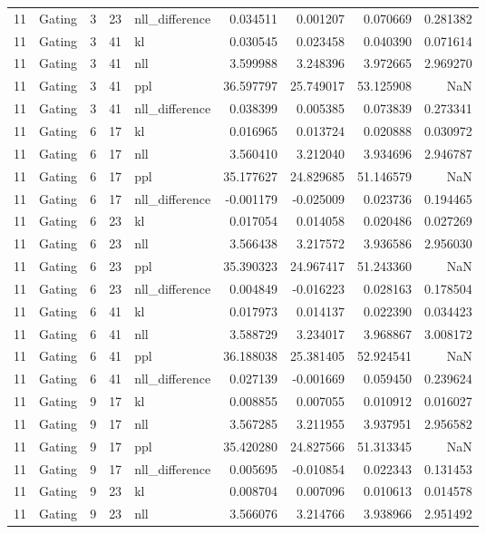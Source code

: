 \begin{tabular}{rlrrlrrrr}
11 & Gating & 3 & 23 & nll_difference & 0.034511 & 0.001207 & 0.070669 & 0.281382 \\
11 & Gating & 3 & 41 & kl & 0.030545 & 0.023458 & 0.040390 & 0.071614 \\
11 & Gating & 3 & 41 & nll & 3.599988 & 3.248396 & 3.972665 & 2.969270 \\
11 & Gating & 3 & 41 & ppl & 36.597797 & 25.749017 & 53.125908 & NaN \\
11 & Gating & 3 & 41 & nll_difference & 0.038399 & 0.005385 & 0.073839 & 0.273341 \\
11 & Gating & 6 & 17 & kl & 0.016965 & 0.013724 & 0.020888 & 0.030972 \\
11 & Gating & 6 & 17 & nll & 3.560410 & 3.212040 & 3.934696 & 2.946787 \\
11 & Gating & 6 & 17 & ppl & 35.177627 & 24.829685 & 51.146579 & NaN \\
11 & Gating & 6 & 17 & nll_difference & -0.001179 & -0.025009 & 0.023736 & 0.194465 \\
11 & Gating & 6 & 23 & kl & 0.017054 & 0.014058 & 0.020486 & 0.027269 \\
11 & Gating & 6 & 23 & nll & 3.566438 & 3.217572 & 3.936586 & 2.956030 \\
11 & Gating & 6 & 23 & ppl & 35.390323 & 24.967417 & 51.243360 & NaN \\
11 & Gating & 6 & 23 & nll_difference & 0.004849 & -0.016223 & 0.028163 & 0.178504 \\
11 & Gating & 6 & 41 & kl & 0.017973 & 0.014137 & 0.022390 & 0.034423 \\
11 & Gating & 6 & 41 & nll & 3.588729 & 3.234017 & 3.968867 & 3.008172 \\
11 & Gating & 6 & 41 & ppl & 36.188038 & 25.381405 & 52.924541 & NaN \\
11 & Gating & 6 & 41 & nll_difference & 0.027139 & -0.001669 & 0.059450 & 0.239624 \\
11 & Gating & 9 & 17 & kl & 0.008855 & 0.007055 & 0.010912 & 0.016027 \\
11 & Gating & 9 & 17 & nll & 3.567285 & 3.211955 & 3.937951 & 2.956582 \\
11 & Gating & 9 & 17 & ppl & 35.420280 & 24.827566 & 51.313345 & NaN \\
11 & Gating & 9 & 17 & nll_difference & 0.005695 & -0.010854 & 0.022343 & 0.131453 \\
11 & Gating & 9 & 23 & kl & 0.008704 & 0.007096 & 0.010613 & 0.014578 \\
11 & Gating & 9 & 23 & nll & 3.566076 & 3.214766 & 3.938966 & 2.951492 \\

\end{tabular}
